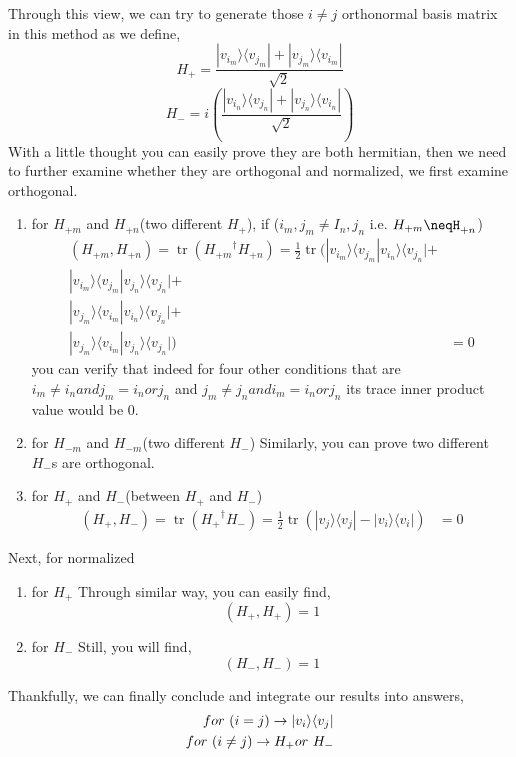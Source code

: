 Through this view, we can try to generate those $i \neq j$ orthonormal basis matrix in this method as we define, 
\begin{equation}
   H_{+} = \frac{|v_i_m\rangle\langle v_j_m|+|v_j_m\rangle\langle v_i_m|}{\sqrt{2}}
\end{equation}
\begin{equation}
   H_{-} = i(\frac{|v_i_n\rangle\langle v_j_n|+|v_j_n\rangle\langle v_i_n|}{\sqrt{2}})
\end{equation}
With a little thought you can easily prove they are both hermitian, then we need to further examine whether they are orthogonal and normalized, we first examine orthogonal.
\begin{enumerate}
    \item for $H_{+m}$ and $H_{+n}$(two different $H_{+}$), if ($i_m, j_m \neq I_n, j_n$ i.e. $H_{+m}\neqH_{+n}$)
    \begin{equation}
    \begin{align}
        (H_{+m},H_{+n}) = \operatorname{tr}({H_{+m}}^{\dag}H_{+n}) = \frac{1}{2}\operatorname{tr}(|v_i_m\rangle\langle v_j_m|v_i_n\rangle\langle v_j_n|+&\\|v_i_m\rangle\langle v_j_m|v_j_n\rangle\langle v_j_n|+&\\|v_j_m\rangle\langle v_i_m|v_i_n\rangle\langle v_j_n|+&\\|v_j_m\rangle\langle v_i_m|v_j_n\rangle\langle v_j_n|) &= 0
    \end{align}
    \end{equation}
    you can verify that indeed for four other conditions that are  $i_m \neq i_n and j_m = i_n or j_n$ and $j_m \neq j_n and i_m = i_n or j_n$ its trace inner product value would be 0. 
    \item for $H_{-m}$ and $H_{-m}$(two different $H_{-}$)
    Similarly, you can prove two different $H_{-}$s are orthogonal. 
    \item for $H_{+}$ and $H_{-}$(between $H_{+}$ and $H_{-}$)
    \begin{equation}
    \begin{align}
        (H_{+},H_{-}) = \operatorname{tr}({H_{+}}^{\dag}H_{-}) = \frac{1}{2}\operatorname{tr}(|v_j\rangle\langle v_j|-|v_i\rangle\langle v_i|) &= 0
    \end{align}
    \end{equation}
\end{enumerate}
Next, for normalized
\begin{enumerate}
    \item for $H_{+}$ 
    Through similar way, you can easily find,     \begin{equation}
         (H_{+},H_{+}) = 1
     \end{equation}
    \item for $H_{-}$ Still, you will find,
     \begin{equation}
         (H_{-},H_{-}) = 1
     \end{equation}
\end{enumerate}
Thankfully, we can finally conclude and integrate our results into answers,
\begin{equation}
\begin{split}
    for\ (i = j) \space \rightarrow|v_i\rangle\langle v_j|\\
    for\ (i \neq j)\rightarrow H_{+} or\ H_{-}
\end{split}
\end{equation}

